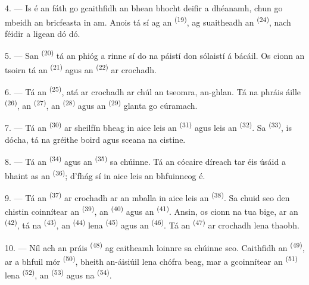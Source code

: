 4. --- Is é an fáth go gcaithfidh an bhean bhocht deifir a dhéanamh, chun go mbeidh
an bricfeasta in am. Anois tá sí ag an  \textsuperscript{(19)}, ag
suaitheadh an  \textsuperscript{(24)}, nach féidir a ligean dó
dó.

5. --- San  \textsuperscript{(20)} tá an phióg a rinne sí do na
páistí don sólaistí á bácáil. Os cionn an tsoirn tá an 
\textsuperscript{(21)} agus an  \textsuperscript{(22)} ar
crochadh.

\VUsaut{4.0mm}
\VUsaut{3.0mm}

6. --- Tá an  \textsuperscript{(25)}, atá ar crochadh ar chúl
an tseomra, an-ghlan. Tá na  phráis áille \textsuperscript{(26)}, an
 \textsuperscript{(27)}, an 
\textsuperscript{(28)} agus an  \textsuperscript{(29)} glanta go
cúramach.

7. --- Tá an  \textsuperscript{(30)} ar sheilfín bheag in aice leis
an  \textsuperscript{(31)} agus leis an 
\textsuperscript{(32)}. Sa  \textsuperscript{(33)}, is dócha, tá
na gréithe boird agus sceana na cistine.

8. --- Tá an  \textsuperscript{(34)} agus an 
\textsuperscript{(35)} sa chúinne. Tá an cócaire díreach tar éis úsáid a bhaint as
an  \textsuperscript{(36)}; d'fhág sí in aice leis an
bhfuinneog é.

9. --- Tá an  \textsuperscript{(37)} ar crochadh ar an mballa in
aice leis an  \textsuperscript{(38)}. Sa chuid seo den chistin
coinnítear an  \textsuperscript{(39)}, an 
\textsuperscript{(40)} agus an  \textsuperscript{(41)}.
Ansin, os cionn na tua bige, ar an  \textsuperscript{(42)}, tá na
 \textsuperscript{(43)}, an 
\textsuperscript{(44)} lena  \textsuperscript{(45)} agus an
 \textsuperscript{(46)}. Tá an 
\textsuperscript{(47)} ar crochadh lena thaobh.

10. --- Níl ach an  práis \textsuperscript{(48)} ag caitheamh
loinnre sa chúinne seo. Caithfidh an  \textsuperscript{(49)}, ar a
bhfuil  mór \textsuperscript{(50)}, bheith an-áisiúil lena chófra
beag, mar a gcoinnítear an  \textsuperscript{(51)} lena
 \textsuperscript{(52)}, an 
\textsuperscript{(53)} agus na  \textsuperscript{(54)}.

